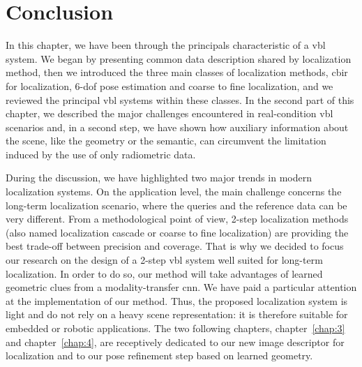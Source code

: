 \section{Conclusion}

In this chapter, we have been through the principals characteristic of a \ac{vbl} system. We began by presenting common data description shared by localization method, then we introduced the three main classes of localization methods, \ac{cbir} for localization, 6-\ac{dof} pose estimation and coarse to fine localization, and we reviewed the principal \ac{vbl} systems within these classes. In the second part of this chapter, we described the major challenges encountered in real-condition \ac{vbl} scenarios and, in a second step, we have shown how auxiliary information about the scene, like the geometry or the semantic, can circumvent the limitation induced by the use of only radiometric data.

During the discussion, we have highlighted two major trends in modern localization systems. On the application level, the main challenge concerns the long-term localization scenario, where the queries and the reference data can be very different. From a methodological point of view, 2-step localization methods (also named localization cascade or coarse to fine localization) are providing the best trade-off between precision and coverage. That is why we decided to focus our research on the design of a 2-step \ac{vbl} system well suited for long-term localization. In order to do so, our method will take advantages of learned geometric clues from a modality-transfer \ac{cnn}. We have paid a particular attention at the implementation of our method. Thus, the proposed localization system is light and do not rely on a heavy scene representation: it is therefore suitable for embedded or robotic applications. The two following chapters, chapter~\ref{chap:3} and chapter~\ref{chap:4}, are receptively dedicated to our new image descriptor for localization and to our pose refinement step based on learned geometry.



